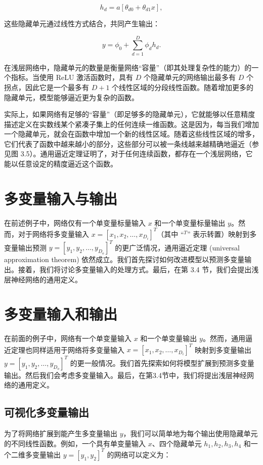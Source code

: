 \documentclass[lang=cn,newtx,10pt,scheme=chinese]{elegantbook}
\begin{document}
\begin{equation}
h_d = a[\theta_{d0} + \theta_{d1}x], 
\end{equation}

这些隐藏单元通过线性方式结合，共同产生输出：

\begin{equation}
y = \phi_0 + \sum_{d=1}^{D} \phi_dh_d. 
\end{equation}

在浅层网络中，隐藏单元的数量是衡量网络“容量”（即其处理复杂性的能力）的一个指标。当使用 ReLU 激活函数时，具有 \(D\) 个隐藏单元的网络输出最多有 \(D\) 个拐点，因此它是一个最多有 \(D + 1\) 个线性区域的分段线性函数。随着增加更多的隐藏单元，模型能够逼近更为复杂的函数。

实际上，如果网络有足够的“容量”（即足够多的隐藏单元），它就能够以任意精度描述定义在实数线某个紧凑子集上的任何连续一维函数。这是因为，每当我们增加一个隐藏单元，就会在函数中增加一个新的线性区域。随着这些线性区域的增多，它们代表了函数中越来越小的部分，这些部分可以被一条线越来越精确地逼近（参见图 3.5）。通用逼近定理证明了，对于任何连续函数，都存在一个浅层网络，它能以任意设定的精度逼近这个函数。

\section{多变量输入与输出}
在前述例子中，网络仅有一个单变量标量输入 \(x\) 和一个单变量标量输出 \(y\)。然而，对于网络将多变量输入 \(x = [x_1, x_2, \dots, x_{D_i}]^T\)（其中 “\(^T\)” 表示转置）映射到多变量输出预测 \(y = [y_1, y_2, \dots, y_{D_o}]^T\) 的更广泛情况，通用逼近定理 (universal approximation theorem) 依然成立。我们首先探讨如何改进模型以预测多变量输出。接着，我们将讨论多变量输入的处理方式。最后，在第 3.4 节，我们会提出浅层神经网络的通用定义。
\section{多变量输入和输出}
在前面的例子中，网络有一个单变量输入 \(x\) 和一个单变量输出 \(y\)。然而，通用逼近定理也同样适用于网络将多变量输入 \(x = [x_1, x_2, \dots, x_{D_i}]^T\) 映射到多变量输出 \(y = [y_1, y_2, \dots, y_{D_o}]^T\) 的更一般情况。我们首先探索如何将模型扩展到预测多变量输出。然后我们会考虑多变量输入。最后，在第3.4节中，我们将提出浅层神经网络的通用定义。
\subsection{可视化多变量输出}
为了将网络扩展到能产生多变量输出 \(y\)，我们可以简单地为每个输出使用隐藏单元的不同线性函数。例如，一个具有单变量输入 \(x\)、四个隐藏单元 \(h_1, h_2, h_3, h_4\) 和一个二维多变量输出 \(y = [y_1, y_2]^T\) 的网络可以定义为：
\end{document}
